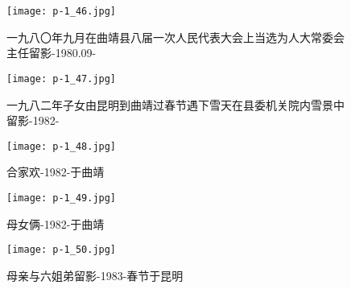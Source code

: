 \clearpage


\begin{figure}
    \begin{center}
        \texttt{[image: p-1\_46.jpg]}
        \begin{shaded}
            \caption{一九八〇年九月在曲靖县八届一次人民代表大会上当选为人大常委会主任留影-1980.09-}
        \end{shaded}
    \end{center}
\end{figure}

\clearpage


\begin{figure}
    \begin{center}
        \texttt{[image: p-1\_47.jpg]}
        \begin{shaded}
            \caption{一九八二年子女由昆明到曲靖过春节遇下雪天在县委机关院内雪景中留影-1982-}
        \end{shaded}
    \end{center}
\end{figure}

\clearpage


\begin{figure}
    \begin{center}
        \texttt{[image: p-1\_48.jpg]}
        \begin{shaded}
            \caption{合家欢-1982-于曲靖}
        \end{shaded}
    \end{center}
\end{figure}

\clearpage


\begin{figure}
    \begin{center}
        \texttt{[image: p-1\_49.jpg]}
        \begin{shaded}
            \caption{母女俩-1982-于曲靖}
        \end{shaded}
    \end{center}
\end{figure}

\clearpage


\begin{figure}
    \begin{center}
        \texttt{[image: p-1\_50.jpg]}
        \begin{shaded}
            \caption{母亲与六姐弟留影-1983-春节于昆明}
        \end{shaded}
    \end{center}
\end{figure}

